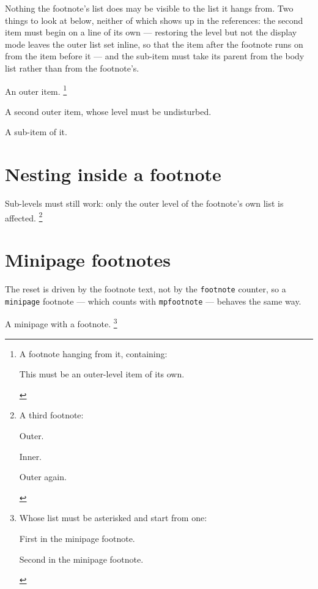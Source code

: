 \documentclass{article}
\begin{document}
Nothing the footnote's list does may be visible to the list it hangs from.
Two things to look at below, neither of which shows up in the references: the
second item must begin on a line of its own --- restoring the level but not
the display mode leaves the outer list set inline, so that the item after the
footnote runs on from the item before it --- and the sub-item must take its
parent from the body list rather than from the footnote's.

\begin{prop}
  \item An outer item.%
  \footnote{A footnote hanging from it, containing:
    \begin{prop}
      \item This must be an outer-level item of its own. \label{fn:in}
    \end{prop}}
  \item A second outer item, whose level must be undisturbed. \label{fn:after}
  \begin{prop}
    \item A sub-item of it. \label{fn:sub}
  \end{prop}
\end{prop}

\section{Nesting inside a footnote}

Sub-levels must still work: only the outer level of the footnote's own list
is affected.%
\footnote{A third footnote:
  \begin{prop}
    \item Outer. \label{f3:1}
    \begin{prop}
      \item Inner. \label{f3:2}
    \end{prop}
    \item Outer again. \label{f3:3}
  \end{prop}}

\section{Minipage footnotes}

The reset is driven by the footnote text, not by the \texttt{footnote}
counter, so a \texttt{minipage} footnote --- which counts with
\texttt{mpfootnote} --- behaves the same way.

\begin{center}
\begin{minipage}{0.7\textwidth}
A minipage with a footnote.%
\footnote{Whose list must be asterisked and start from one:
  \begin{prop}
    \item First in the minipage footnote. \label{m:1}
    \item Second in the minipage footnote. \label{m:2}
  \end{prop}}
\end{minipage}
\end{center}
\end{document}
